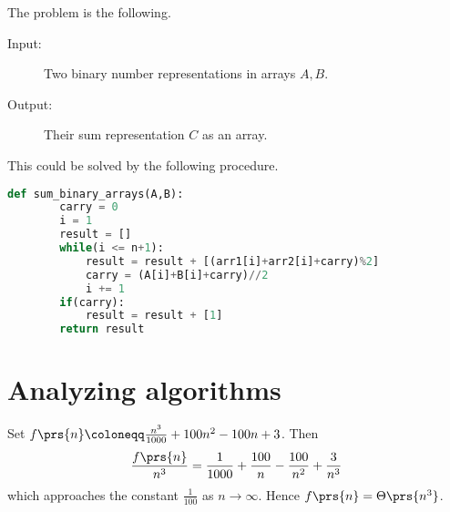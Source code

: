 \documentclass[oneside]{scrbook}
\theoremstyle{definition}
\begin{document}
\begin{exercise}
    The problem is the following.
    \begin{description}
    \item[Input:] Two binary number representations in arrays $A,B$.
    \item[Output:] Their sum representation $C$ as an array.
    \end{description}
    
    This could be solved by the following procedure.
    \begin{lstlisting}[language=Python]
    def sum_binary_arrays(A,B):
    	carry = 0
    	i = 1
    	result = []
    	while(i <= n+1):
    		result = result + [(arr1[i]+arr2[i]+carry)%2]
    		carry = (A[i]+B[i]+carry)//2
            i += 1
    	if(carry):
    		result = result + [1]
    	return result
    \end{lstlisting}
\end{exercise}

\section{Analyzing algorithms}

\begin{exercise}
\end{exercise}

\begin{exercise}
    Set $f\prs{n} \coloneqq \frac{n^3}{1000} + 100 n^2 - 100n + 3$.
    Then
    \[\frac{f\prs{n}}{n^3} = \frac{1}{1000} + \frac{100}{n} - \frac{100}{n^2} + \frac{3}{n^3}\]
    which approaches the constant $\frac{1}{100}$ as $n \to \infty$. Hence $f\prs{n} = \Theta\prs{n^3}$.
\end{exercise}
\end{document}
